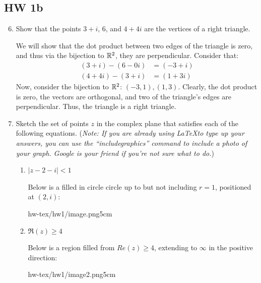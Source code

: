 \subsection*{HW 1b} 
\begin{enumerate}

	\setcounter{enumi}{5}
	\item Show that the points $3+i$, $6$, and $4+4i$ are the vertices of a right triangle.
		\begin{problem}
            We will show that the dot product between two edges of the triangle is zero, and thus via the bijection to $\mathbb{R}^2$, they are perpendicular.\gline{}
            Consider that:
            \begin{align*}
                (3 + i) - (6-0i) &= (-3 + i)\\
                (4+4i) - (3 + i) &= (1 + 3i)
            \end{align*}
            Now, consider the bijection to $\mathbb{R}^2$: $(-3, 1), (1, 3)$. Clearly, the dot product is zero, the vectors are orthogonal, and two of the triangle's edges are perpendicular. Thus, the triangle is a right triangle. 
        \end{problem}
	


	\item Sketch the set of points $z$ in the complex plane that satisfies each of the following equations. ({\it Note: If you are already using \LaTeX to type up your answers, you can use the ``includegraphics'' command to include a photo of your graph. Google is your friend if you're not sure what to do.})
	\begin{enumerate}




		\item $|z-2-i| < 1$
			\begin{problem}
                Below is a filled in circle circle up to but not including $r =1$, positioned at $(2,i)$:
                \begin{gimage}{hw-tex/hw1/image.png}{5cm}\end{gimage}
            \end{problem}




		\item $\Re(z) \geq 4$
		
        \begin{problem}
            Below is a region filled from $Re(z) \ge 4$, extending to $\infty$ in the positive direction:
            \begin{gimage}{hw-tex/hw1/image2.png}{5cm}\end{gimage}
        \end{problem}
		




\end{enumerate}
\end{enumerate}
